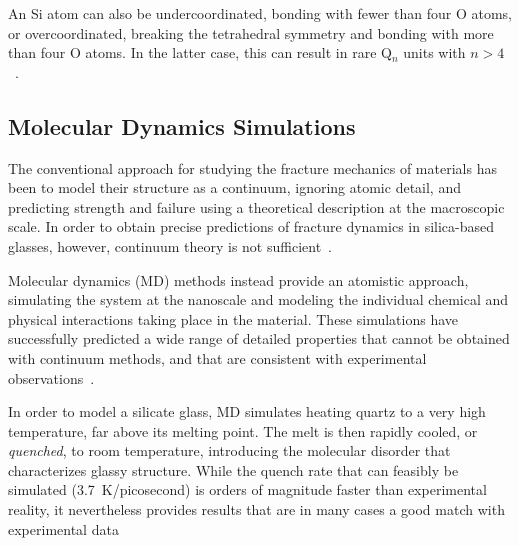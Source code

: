 An Si atom can also be undercoordinated, bonding with fewer than four O atoms, or overcoordinated, breaking the tetrahedral symmetry and bonding with more than four O atoms.  In the latter case, this can result in rare Q$_n$ units with $n>4$~\cite{pedone2015dynamics}.



\subsection{Molecular Dynamics Simulations} 

The conventional approach for studying the fracture mechanics of materials has been to model their structure as a continuum, ignoring atomic detail, and predicting strength and failure using a theoretical description at the macroscopic scale.  In order to obtain precise predictions of fracture dynamics in silica-based glasses, however, continuum theory is not sufficient~\cite{shimada2015breakdown}.

Molecular dynamics (MD) methods instead provide an atomistic approach, simulating the system at the nanoscale and modeling the individual chemical and physical interactions taking place in the material. These simulations have successfully predicted a wide range of detailed properties that cannot be obtained with continuum methods, and that are consistent with experimental observations~\cite{pedone2009properties}.

In order to model a silicate glass, MD simulates heating quartz to a very high temperature, far above its melting point.  The melt is then rapidly cooled, or \emph{quenched}, to room temperature, introducing the molecular disorder that characterizes glassy structure.  While the quench rate that can feasibly be simulated (3.7~K/picosecond) is orders of magnitude faster than experimental reality, it nevertheless provides results that are in many cases a good match with experimental data~\cite{markpres,mWilson_continuum_stress}

